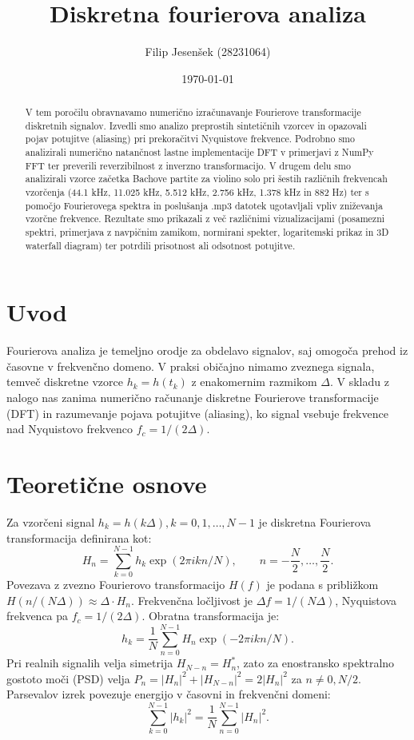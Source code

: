 \documentclass[12pt,a4paper]{article}
\title{Diskretna fourierova analiza}
\author{Filip Jesenšek (28231064)}
\date{\today}
\begin{document}
\maketitle

\begin{abstract}
V tem poročilu obravnavamo numerično izračunavanje Fourierove transformacije diskretnih signalov. Izvedli smo analizo preprostih sintetičnih vzorcev in opazovali pojav potujitve (aliasing) pri prekoračitvi Nyquistove frekvence. Podrobno smo analizirali numerično natančnost lastne implementacije DFT v primerjavi z NumPy FFT ter preverili reverzibilnost z inverzno transformacijo. V drugem delu smo analizirali vzorce začetka Bachove partite za violino solo pri šestih različnih frekvencah vzorčenja (44.1 kHz, 11.025 kHz, 5.512 kHz, 2.756 kHz, 1.378 kHz in 882 Hz) ter s pomočjo Fourierovega spektra in poslušanja .mp3 datotek ugotavljali vpliv zniževanja vzorčne frekvence. Rezultate smo prikazali z več različnimi vizualizacijami (posamezni spektri, primerjava z navpičnim zamikom, normirani spekter, logaritemski prikaz in 3D waterfall diagram) ter potrdili prisotnost ali odsotnost potujitve.
\end{abstract}

\section{Uvod}
Fourierova analiza je temeljno orodje za obdelavo signalov, saj omogoča prehod iz časovne v frekvenčno domeno. V praksi običajno nimamo zveznega signala, temveč diskretne vzorce \(h_k = h(t_k)\) z enakomernim razmikom \(\Delta\). V skladu z nalogo nas zanima numerično računanje diskretne Fourierove transformacije (DFT) in razumevanje pojava potujitve (aliasing), ko signal vsebuje frekvence nad Nyquistovo frekvenco \(f_c = 1/(2\Delta)\).

\section{Teoretične osnove}
Za vzorčeni signal \(h_k = h(k\Delta), k=0,1,\dots, N-1\) je diskretna Fourierova transformacija definirana kot:
\begin{equation}
H_n = \sum_{k=0}^{N-1} h_k \exp\left(2\pi i k n / N\right), \qquad n = -\frac{N}{2}, \dots, \frac{N}{2}.
\end{equation}
Povezava z zvezno Fourierovo transformacijo \(H(f)\) je podana s približkom \(H(n/(N\Delta)) \approx \Delta \cdot H_n\). Frekvenčna ločljivost je \(\Delta f = 1/(N\Delta)\), Nyquistova frekvenca pa \(f_c = 1/(2\Delta)\). Obratna transformacija je:
\begin{equation}
h_k = \frac{1}{N} \sum_{n=0}^{N-1} H_n \exp\left(-2\pi i k n / N\right).
\end{equation}
Pri realnih signalih velja simetrija \(H_{N-n} = H_n^*\), zato za enostransko spektralno gostoto moči (PSD) velja \(P_n = |H_n|^2 + |H_{N-n}|^2 = 2|H_n|^2\) za \(n \neq 0, N/2\). Parsevalov izrek povezuje energijo v časovni in frekvenčni domeni:
\begin{equation}
\sum_{k=0}^{N-1} |h_k|^2 = \frac{1}{N} \sum_{n=0}^{N-1} |H_n|^2.
\end{equation}
\end{document}
